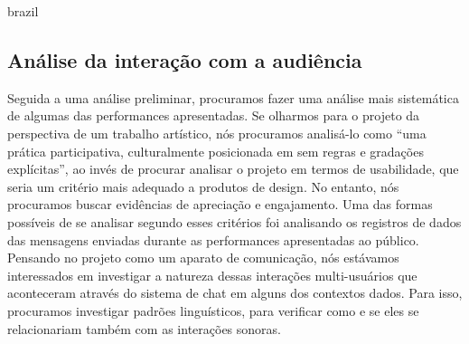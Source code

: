 \begin{otherlanguage*}{brazil}
%


\subsection{Análise da interação com a audiência}

Seguida a uma análise preliminar, procuramos fazer uma análise mais sistemática de algumas das performances apresentadas. Se olharmos para o projeto da perspectiva de um trabalho artístico, nós procuramos analisá-lo como ``uma prática participativa, culturalmente posicionada em sem regras e gradações explícitas''\cite{McCullough1998}, ao invés de procurar analisar o projeto em termos de usabilidade, que seria um critério mais adequado a produtos de design. No entanto, nós procuramos buscar evidências de apreciação e engajamento. Uma das formas possíveis de se analisar segundo esses critérios foi analisando os registros de dados das mensagens enviadas durante as performances apresentadas ao público. Pensando no projeto como um aparato de comunicação, nós estávamos interessados em investigar a natureza dessas interações multi-usuários que aconteceram através do sistema de chat em alguns dos contextos dados. Para isso, procuramos investigar padrões linguísticos, para verificar como e se eles se relacionariam também com as interações sonoras.




\end{otherlanguage*}
